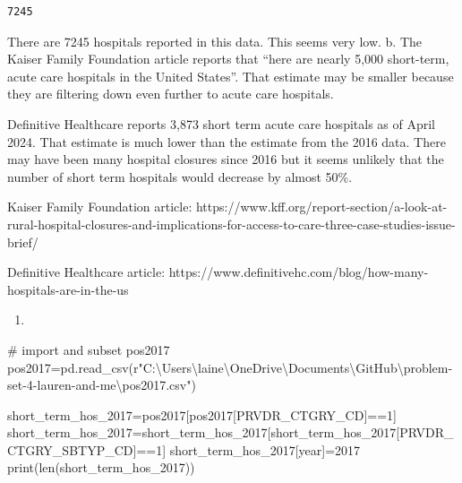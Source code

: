 \documentclass[
  letterpaper,
  DIV=11,
  numbers=noendperiod]{scrartcl}
\newenvironment{Shaded}{\begin{snugshade}}{\end{snugshade}}
\newcommand{\BuiltInTok}[1]{\textcolor[rgb]{0.00,0.23,0.31}{#1}}
\newcommand{\CommentTok}[1]{\textcolor[rgb]{0.37,0.37,0.37}{#1}}
\newcommand{\DecValTok}[1]{\textcolor[rgb]{0.68,0.00,0.00}{#1}}
\newcommand{\NormalTok}[1]{\textcolor[rgb]{0.00,0.23,0.31}{#1}}
\newcommand{\OperatorTok}[1]{\textcolor[rgb]{0.37,0.37,0.37}{#1}}
\newcommand{\StringTok}[1]{\textcolor[rgb]{0.13,0.47,0.30}{#1}}
\newcommand{\VerbatimStringTok}[1]{\textcolor[rgb]{0.13,0.47,0.30}{#1}}
\providecommand{\tightlist}{%
  \setlength{\itemsep}{0pt}\setlength{\parskip}{0pt}}\usepackage{longtable,booktabs,array}
\begin{document}
\begin{verbatim}
7245
\end{verbatim}

There are 7245 hospitals reported in this data. This seems very low. b.
The Kaiser Family Foundation article reports that ``here are nearly
5,000 short-term, acute care hospitals in the United States''. That
estimate may be smaller because they are filtering down even further to
acute care hospitals.

Definitive Healthcare reports 3,873 short term acute care hospitals as
of April 2024. That estimate is much lower than the estimate from the
2016 data. There may have been many hospital closures since 2016 but it
seems unlikely that the number of short term hospitals would decrease by
almost 50\%.

Kaiser Family Foundation article:
https://www.kff.org/report-section/a-look-at-rural-hospital-closures-and-implications-for-access-to-care-three-case-studies-issue-brief/

Definitive Healthcare article:
https://www.definitivehc.com/blog/how-many-hospitals-are-in-the-us

\begin{enumerate}
\def\labelenumi{\arabic{enumi}.}
\setcounter{enumi}{2}
\tightlist
\item
\end{enumerate}

\begin{Shaded}
\begin{Highlighting}[]
\CommentTok{\# import and subset pos2017}
\NormalTok{pos2017}\OperatorTok{=}\NormalTok{pd.read\_csv(}\VerbatimStringTok{r"C:\textbackslash{}Users\textbackslash{}laine\textbackslash{}OneDrive\textbackslash{}Documents\textbackslash{}GitHub\textbackslash{}problem{-}set{-}4{-}lauren{-}and{-}me\textbackslash{}pos2017.csv"}\NormalTok{)}

\NormalTok{short\_term\_hos\_2017}\OperatorTok{=}\NormalTok{pos2017[pos2017[}\StringTok{\textquotesingle{}PRVDR\_CTGRY\_CD\textquotesingle{}}\NormalTok{]}\OperatorTok{==}\DecValTok{1}\NormalTok{]}
\NormalTok{short\_term\_hos\_2017}\OperatorTok{=}\NormalTok{short\_term\_hos\_2017[short\_term\_hos\_2017[}\StringTok{\textquotesingle{}PRVDR\_CTGRY\_SBTYP\_CD\textquotesingle{}}\NormalTok{]}\OperatorTok{==}\DecValTok{1}\NormalTok{]}
\NormalTok{short\_term\_hos\_2017[}\StringTok{\textquotesingle{}year\textquotesingle{}}\NormalTok{]}\OperatorTok{=}\DecValTok{2017}
\BuiltInTok{print}\NormalTok{(}\BuiltInTok{len}\NormalTok{(short\_term\_hos\_2017))}
\end{Highlighting}
\end{Shaded}
\end{document}
